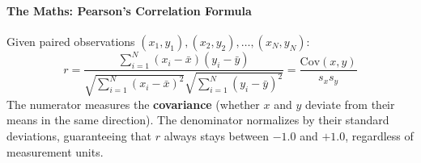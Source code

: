 \paragraph{The Maths: Pearson's Correlation Formula}
Given paired observations $(x_1, y_1), (x_2, y_2), \dots, (x_N, y_N)$:
\begin{equation}
r = \frac{\sum_{i=1}^N (x_i - \bar{x})(y_i - \bar{y})}{\sqrt{\sum_{i=1}^N (x_i - \bar{x})^2} \sqrt{\sum_{i=1}^N (y_i - \bar{y})^2}} = \frac{\text{Cov}(x, y)}{s_x s_y}\label{eq:pearson_r}
\end{equation}
The numerator measures the \textbf{covariance} (whether $x$ and $y$ deviate from their means in the same direction). The denominator normalizes by their standard deviations, guaranteeing that $r$ always stays between $-1.0$ and $+1.0$, regardless of measurement units.

